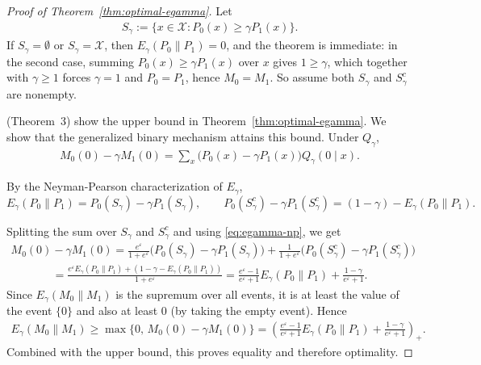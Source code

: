 \documentclass{article}
\theoremstyle{plain}
\theoremstyle{definition}
\theoremstyle{plain}
\newcommand{\eps}{\varepsilon}
\newcommand{\X}{\mathcal{X}}
\begin{document}
\begin{proof}[Proof of Theorem~\ref{thm:optimal-egamma}]
Let
\begin{align*}
    S_\gamma := \{ x \in \X : P_0(x) \ge \gamma P_1(x) \}.
\end{align*}
If $S_\gamma = \emptyset$ or $S_\gamma = \X$, then $E_\gamma(P_0\|P_1) = 0$, and the theorem is immediate: in the second case, summing $P_0(x) \ge \gamma P_1(x)$ over $x$ gives $1 \ge \gamma$, which together with $\gamma \ge 1$ forces $\gamma = 1$ and $P_0 = P_1$, hence $M_0 = M_1$. So assume both $S_\gamma$ and $S_\gamma^c$ are nonempty.

\citet{Zamanlooy2024E_gammaMixing} (Theorem~3) show the upper bound in Theorem~\ref{thm:optimal-egamma}. We show that the generalized binary mechanism attains this bound. Under $Q_\gamma$,
\begin{align*}
    M_0(0) - \gamma M_1(0)
    = \sum_x \bigl( P_0(x) - \gamma P_1(x) \bigr) Q_\gamma(0 \mid x).
\end{align*}

By the Neyman-Pearson characterization of $E_\gamma$,
\begin{equation}
    \label{eq:egamma-np}
    E_\gamma(P_0\|P_1) = P_0(S_\gamma) - \gamma P_1(S_\gamma),
    \qquad
    P_0(S_\gamma^c) - \gamma P_1(S_\gamma^c) = (1 - \gamma) - E_\gamma(P_0\|P_1) .
\end{equation}

Splitting the sum over $S_\gamma$ and $S_\gamma^c$ and using \eqref{eq:egamma-np}, we get
\begin{align*}
    M_0(0) - \gamma M_1(0)
    = \frac{e^\eps}{1 + e^\eps} \bigl( P_0(S_\gamma) - \gamma P_1(S_\gamma) \bigr)
    + \frac{1}{1 + e^\eps} \bigl( P_0(S_\gamma^c) - \gamma P_1(S_\gamma^c) \bigr)
\end{align*}
\begin{align*}
    = \frac{e^\eps E_\gamma(P_0\|P_1) + (1 - \gamma - E_\gamma(P_0\|P_1))}{1 + e^\eps}
    = \frac{e^\eps - 1}{e^\eps + 1} E_\gamma(P_0 \| P_1) + \frac{1 - \gamma}{e^\eps + 1}.
\end{align*}
Since $E_\gamma(M_0 \| M_1)$ is the supremum over all events, it is at least the value of the event $\{0\}$ and also at least $0$ (by taking the empty event). Hence
\begin{align*}
    E_\gamma(M_0 \| M_1)
    \ge \max\{ 0, \, M_0(0) - \gamma M_1(0) \}
    = \left( \frac{e^\eps - 1}{e^\eps + 1} E_\gamma(P_0 \| P_1) + \frac{1 - \gamma}{e^\eps + 1} \right)_+.
\end{align*}
Combined with the upper bound, this proves equality and therefore optimality.
\end{proof}
\end{document}
